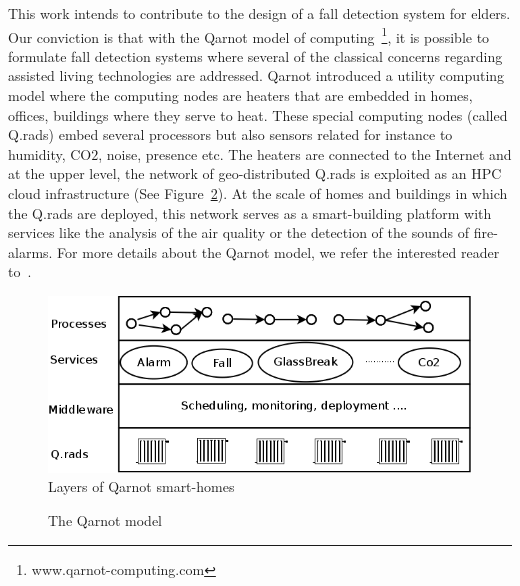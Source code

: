 \documentclass[10pt, conference, compsocconf]{IEEEtran}
\begin{document}
This work intends to contribute to the design of a fall detection system for elders. Our conviction is 
that with the Qarnot model of computing~\footnote{www.qarnot-computing.com}, it is possible to formulate 
fall detection systems where several of the  classical concerns regarding assisted living technologies are 
addressed. Qarnot introduced a utility computing model where the computing nodes are heaters that are 
embedded in homes, offices, buildings where they serve to heat. These special computing nodes (called Q.rads) 
embed several processors but also sensors related for instance to humidity, $\mathrm{CO2}$, noise, presence 
etc. The heaters are connected to the Internet and at the upper level, the network 
of geo-distributed Q.rads is exploited as an HPC cloud infrastructure (See Figure~\ref{fig:digital}). At the scale of homes 
and buildings in which the Q.rads are deployed, this network serves as a smart-building platform with services like 
the analysis of the air quality or the detection of the sounds of fire-alarms. For more details about the Qarnot model, 
we refer the interested reader to~\cite{DBLP:conf/europar/Ngoko16}.

	\begin{figure}[hbtp]
	\centering
        \includegraphics[scale=0.27]{./Figures/layer.png}
	\caption{Layers of Qarnot smart-homes}
	\label{fig:layer}
	\end{figure}


	\begin{figure}[htbp]
	\caption{The Qarnot model}
	\label{fig:digital}
	\end{figure}
\end{document}
